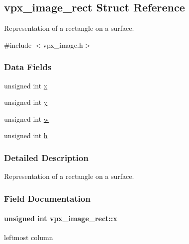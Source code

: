 \hypertarget{structvpx__image__rect}{}\subsection{vpx\+\_\+image\+\_\+rect Struct Reference}
\label{structvpx__image__rect}


Representation of a rectangle on a surface.  




{\ttfamily \#include $<$vpx\+\_\+image.\+h$>$}

\subsubsection*{Data Fields}
\begin{DoxyCompactItemize}
\item 
unsigned int \hyperlink{structvpx__image__rect_a8e38dee721dbf4e121f40c315d45103a}{x}
\item 
unsigned int \hyperlink{structvpx__image__rect_a6d4457644e2ce0d54af55eb313a37204}{y}
\item 
unsigned int \hyperlink{structvpx__image__rect_a4b4fcec1e4cdcbd9dde5d44b6ad16dab}{w}
\item 
unsigned int \hyperlink{structvpx__image__rect_afeb74a8c6f0c7e24d82b80db9431a501}{h}
\end{DoxyCompactItemize}


\subsubsection{Detailed Description}
Representation of a rectangle on a surface. 

\subsubsection{Field Documentation}
\paragraph[{\texorpdfstring{x}{x}}]{\setlength{\rightskip}{0pt plus 5cm}unsigned int vpx\+\_\+image\+\_\+rect\+::x}\hypertarget{structvpx__image__rect_a8e38dee721dbf4e121f40c315d45103a}{}\label{structvpx__image__rect_a8e38dee721dbf4e121f40c315d45103a}
leftmost column 
